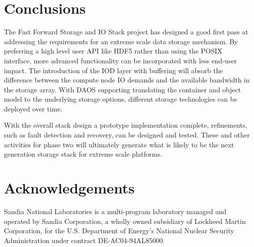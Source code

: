 \documentclass[conference]{IEEEtran} \pdfpagewidth=8.5in
\begin{document}
\section{Conclusions}
\label{sec:conclusion}

The Fast Forward Storage and IO Stack project has designed a good first pass at
addressing the requirements for an extreme scale data storage mechanism.  By
preferring a high level user API like HDF5 rather than using the POSIX
interface, more advanced functionality can be incorporated with less end-user
impact. The introduction of the IOD layer with buffering will absorb the
difference between the compute node IO demands and the available bandwidth in
the storage array. With DAOS supporting translating the container and object
model to the underlying storage options, different storage technologies can be
deployed over time.

With the overall stack design a prototype implementation complete, refinements,
such as fault detection and recovery, can be designed and tested.  These and
other activities for phase two will ultimately generate what is likely to be
the next generation storage stack for extreme scale platforms.

\section{Acknowledgements}
Sandia National Laboratories is a multi-program laboratory managed and operated
by Sandia Corporation, a wholly owned subsidiary of Lockheed Martin
Corporation, for the U.S. Department of Energy's National Nuclear Security
Administration under contract DE-AC04-94AL85000.




\vfill\eject
\end{document}
